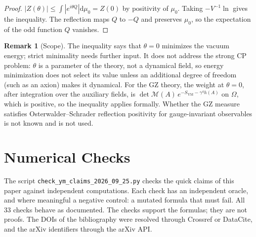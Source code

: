 \documentclass[11pt,a4paper]{amsart}
\theoremstyle{definition}
\newtheorem{remark}[theorem]{Remark}
\newcommand{\diff}{\mathrm{d}}
\begin{document}
\begin{proof}
$|Z(\theta)| \le \int|e^{i\theta Q}|\diff\mu_0 = Z(0)$ by positivity of $\mu_0$. Taking $-V^{-1}\ln$ gives the inequality. The reflection maps $Q$ to $-Q$ and preserves $\mu_0$, so the expectation of the odd function $Q$ vanishes.
\end{proof}

\begin{remark}[Scope]
The inequality says that $\theta = 0$ minimizes the vacuum energy; strict minimality needs further input. It does not address the strong CP problem: $\theta$ is a parameter of the theory, not a dynamical field, so energy minimization does not select its value unless an additional degree of freedom (such as an axion) makes it dynamical. For the GZ theory, the weight at $\theta=0$, after integration over the auxiliary fields, is $\det\mathcal{M}(A)\,e^{-S_{\mathrm{YM}}-\gamma^4 h(A)}$ on $\Omega$, which is positive, so the inequality applies formally. Whether the GZ measure satisfies Osterwalder--Schrader reflection positivity for gauge-invariant observables is not known and is not used.
\end{remark}

\section{Numerical Checks}
\label{sec:numerics}

The script \texttt{check\_ym\_claims\_2026\_09\_25.py} checks the quick claims of this paper against independent computations. Each check has an independent oracle, and where meaningful a negative control: a mutated formula that must fail. All 33 checks behave as documented. The checks support the formulas; they are not proofs. The DOIs of the bibliography were resolved through Crossref or DataCite, and the arXiv identifiers through the arXiv API.
\end{document}
